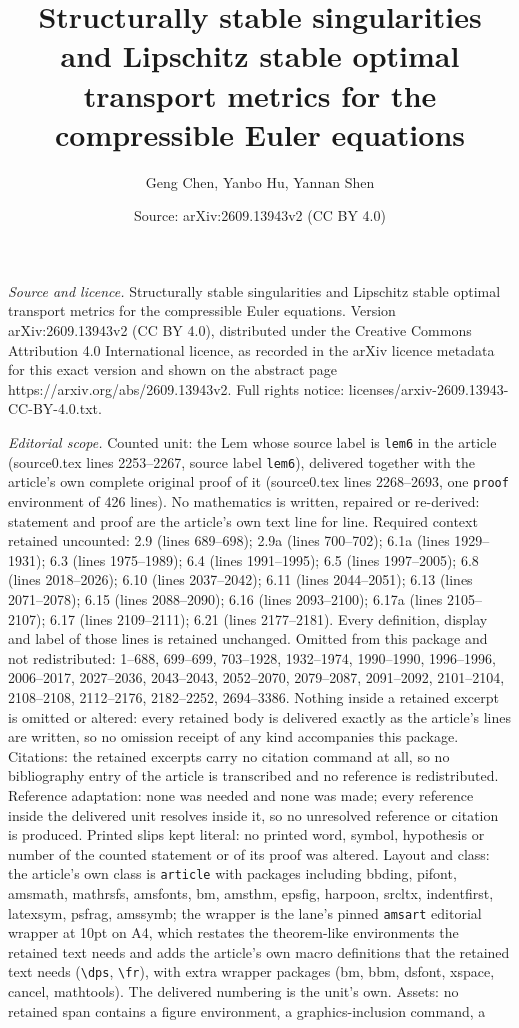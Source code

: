 \documentclass[10pt,a4paper]{amsart}
\title[Structurally stable singularities and Lipschitz stable optim]{Structurally stable singularities and Lipschitz stable optimal transport metrics for the compressible Euler equations}
\author{Geng Chen, Yanbo Hu, Yannan Shen}
\date{Source: arXiv:2609.13943v2 (CC BY 4.0)}
\begin{document}
\maketitle

\noindent\emph{Source and licence.} Structurally stable singularities and Lipschitz stable optimal transport metrics for the compressible Euler equations. Version arXiv:2609.13943v2 (CC BY 4.0), distributed under the Creative Commons Attribution 4.0 International licence, as recorded in the arXiv licence metadata for this exact version and shown on the abstract page https://arxiv.org/abs/2609.13943v2. Full rights notice: licenses/arxiv-2609.13943-CC-BY-4.0.txt.\par\smallskip

\noindent\textit{Editorial scope.} Counted unit: the Lem whose source label is \texttt{lem6} in the article (source0.tex lines 2253--2267, source label \texttt{lem6}), delivered together with the article's own complete original proof of it (source0.tex lines 2268--2693, one \texttt{proof} environment of 426 lines). No mathematics is written, repaired or re-derived: statement and proof are the article's own text line for line. Required context retained uncounted: 2.9 (lines 689--698); 2.9a (lines 700--702); 6.1a (lines 1929--1931); 6.3 (lines 1975--1989); 6.4 (lines 1991--1995); 6.5 (lines 1997--2005); 6.8 (lines 2018--2026); 6.10 (lines 2037--2042); 6.11 (lines 2044--2051); 6.13 (lines 2071--2078); 6.15 (lines 2088--2090); 6.16 (lines 2093--2100); 6.17a (lines 2105--2107); 6.17 (lines 2109--2111); 6.21 (lines 2177--2181). Every definition, display and label of those lines is retained unchanged. Omitted from this package and not redistributed: 1--688, 699--699, 703--1928, 1932--1974, 1990--1990, 1996--1996, 2006--2017, 2027--2036, 2043--2043, 2052--2070, 2079--2087, 2091--2092, 2101--2104, 2108--2108, 2112--2176, 2182--2252, 2694--3386. Nothing inside a retained excerpt is omitted or altered: every retained body is delivered exactly as the article's lines are written, so no omission receipt of any kind accompanies this package. Citations: the retained excerpts carry no citation command at all, so no bibliography entry of the article is transcribed and no reference is redistributed. Reference adaptation: none was needed and none was made; every reference inside the delivered unit resolves inside it, so no unresolved reference or citation is produced. Printed slips kept literal: no printed word, symbol, hypothesis or number of the counted statement or of its proof was altered. Layout and class: the article's own class is \texttt{article} with packages including bbding, pifont, amsmath, mathrsfs, amsfonts, bm, amsthm, epsfig, harpoon, srcltx, indentfirst, latexsym, psfrag, amssymb; the wrapper is the lane's pinned \texttt{amsart} editorial wrapper at 10pt on A4, which restates the theorem-like environments the retained text needs and adds the article's own macro definitions that the retained text needs (\texttt{\textbackslash dps}, \texttt{\textbackslash fr}), with extra wrapper packages (bm, bbm, dsfont, xspace, cancel, mathtools). The delivered numbering is the unit's own. Assets: no retained span contains a figure environment, a graphics-inclusion command, a 
\end{document}
